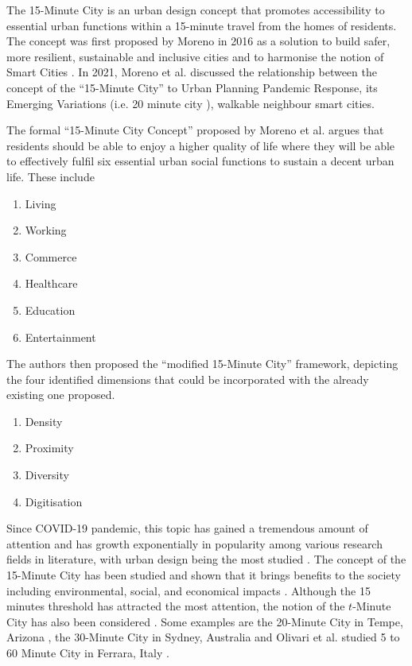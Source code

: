 The 15-Minute City is an urban design concept that promotes accessibility to essential urban functions within a 15-minute travel from the homes of residents. The concept was first proposed by Moreno in 2016 as a solution to build safer, more resilient, sustainable and inclusive cities and to harmonise the notion of Smart Cities \cite{moreno_introducing_2021}. In 2021, Moreno et al. discussed the relationship between the concept of the “15-Minute City” to Urban Planning Pandemic Response, its Emerging Variations (i.e. 20 minute city \cite{capasso_da_silva_accessibility_2019}), walkable neighbour \cite{weng_15-minute_2019} smart cities.

The formal “15-Minute City Concept” proposed by Moreno et al. argues that residents should be able to enjoy a higher quality of life where they will be able to effectively fulfil six essential urban social functions to sustain a decent urban life. These include

\begin{multicols}{2}
    \begin{enumerate}
        \item Living
        \item Working
        \item Commerce
        \item Healthcare
        \item Education
        \item Entertainment
    \end{enumerate}
\end{multicols}

The authors then proposed the “modified 15-Minute City” framework, depicting the four identified dimensions that could be incorporated with the already existing one proposed.

\begin{multicols}{2}
    \begin{enumerate}
        \item Density
        \item Proximity
        \item Diversity
        \item Digitisation
    \end{enumerate}
\end{multicols}
Since COVID-19 pandemic, this topic has gained a tremendous amount of attention and has growth exponentially in popularity \cite{lima_quest_2023,allam_theoretical_2022} among various research fields in literature, with urban design being the most studied \cite{lima_quest_2023}. The concept of the 15-Minute City has been studied and shown that it brings benefits to the society including environmental, social, and economical impacts \cite{allam_theoretical_2022}. Although the 15 minutes threshold has attracted the most attention, the notion of the $t$-Minute City has also been considered \cite{moreno_introducing_2021}. Some examples are the 20-Minute City in Tempe, Arizona \cite{capasso_da_silva_accessibility_2019}, the 30-Minute City in Sydney, Australia \cite{sarkar_measuring_2020} and Olivari et al. studied 5 to 60 Minute City in Ferrara, Italy \cite{olivari_are_2023}. 

